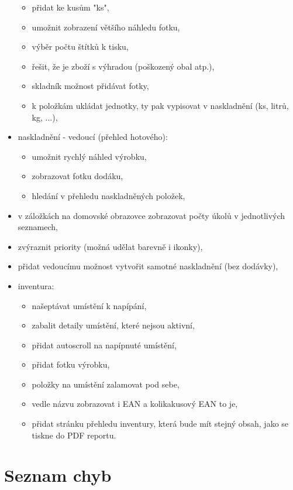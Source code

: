 \begin{itemize}
	\begin{itemize}
		\item přidat ke kusům "ks",
		\item umožnit zobrazení většího náhledu fotku,
		\item výběr počtu štítků k tisku,
		\item řešit, že je zboží s výhradou (poškozený obal atp.),
		\item skladník možnost přidávat fotky,
		\item k položkám ukládat jednotky, ty pak vypisovat v naskladnění (ks, litrů, kg, ...),
	\end{itemize}
	\item naskladnění - vedoucí (přehled hotového):
	\begin{itemize}
		\item umožnit rychlý náhled výrobku,
		\item zobrazovat fotku dodáku,
		\item hledání v přehledu naskladněných položek,
	\end{itemize}
	\item v záložkách na domovské obrazovce zobrazovat počty úkolů v jednotlivých seznamech,
	\item zvýraznit priority (možná udělat barevně i ikonky),
	\item přidat vedoucímu možnost vytvořit samotné naskladnění (bez dodávky),
	\item inventura:
	\begin{itemize}
		\item našeptávat umístění k napípání,
		\item zabalit detaily umístění, které nejsou aktivní,
		\item přidat autoscroll na napípnuté umístění,
		\item přidat fotku výrobku,
		\item položky na umístění zalamovat pod sebe,
		\item vedle názvu zobrazovat i EAN a kolikakusový EAN to je,
		\item přidat stránku přehledu inventury, která bude mít stejný obsah, jako se tiskne do PDF reportu.
	\end{itemize}
\end{itemize}

\section{Seznam chyb}

